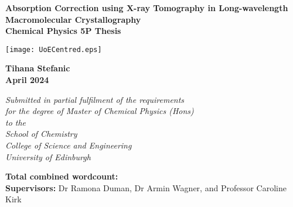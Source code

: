 
\thispagestyle{empty}
\par\noindent                                           %

\begin{singlespace}
	\vspace{1cm}
	\begin{center}
		\Huge\bf\sc Absorption Correction using X-ray Tomography in Long-wavelength Macromolecular Crystallography \\
		\vspace{2mm}
		\large\bf Chemical Physics 5P Thesis
	\end{center}
	\vspace{1cm}
	\begin{center}
		\texttt{[image: UoECentred.eps]}
	\end{center}
	\vspace{1.8cm}
	\begin{center}
		\bf\Large Tihana Stefanic\\                 %
		April 2024                         %
	\end{center}
	
	\begin{center}
		\small\itshape
		Submitted in partial fulfilment of the requirements \\  for the degree of Master of Chemical Physics (Hons) \\
		to the \\
		School of Chemistry \\
		College of Science and Engineering \\
		University of Edinburgh
	\end{center}
	
	
	\vspace*{5mm}   

	
	\vspace*{3cm}
	
	
	\vfill
	{\bf Total combined wordcount:} \\
	{\bf Supervisors:} Dr Ramona Duman, Dr Armin Wagner, and Professor Caroline Kirk              %
\end{singlespace}

\newpage
\footruleheight{1pt}
\headruleheight{1pt}
\rhead{\thepage}
\cfoot{}

